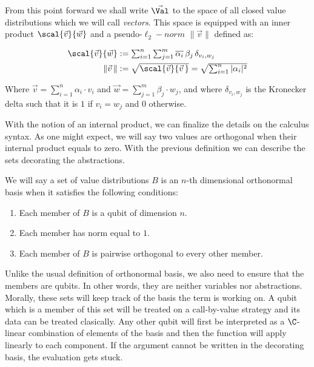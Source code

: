 From this point forward we shall write $\vec{\Val}$ to the space of all closed value distributions which we will call \emph{vectors}. This space is equipped with an inner product $\scal{\vec v}{\vec w}$ and a pseudo-$\ell_2-norm$ $\|\vec v\|$ defined as:

\begin{align*}
  \textstyle\scal{\vec{v}}{\vec{w}}&:=\textstyle\sum_{i=1}^n\sum_{j=1}^m\overline{\alpha_i}\,\beta_j\,\delta_{v_i,w_j}\\
  \textstyle\|\vec{v}\,\|&:=\textstyle\sqrt{\scal{\vec{v}}{\vec{v}\,}}=\textstyle\sqrt{\sum_{i=1}^n|\alpha_i|^2}    
\end{align*}

Where $\vec{v}=\sum_{i=1}^n\alpha_i\cdot v_i$ and $\vec{w}=\sum_{j=1}^m\beta_j\cdot w_j$, and where $\delta_{v_i,w_j}$ is the Kronecker delta such that it is $1$ if $v_i=w_j$ and $0$ otherwise.

With the notion of an internal product, we can finalize the details on the calculus syntax. As one might expect, we will say two values are orthogonal when their internal product equals to zero. With the previous definition we can describe the sets decorating the abstractions.

\begin{definition}\label{def:NthDimensionalBasis}
We will say a set of value distributions $B$ is an $n$-th dimensional orthonormal basis when it satisfies the following conditions:
\begin{enumerate}
  \item Each member of $B$ is a qubit of dimension $n$.
  \item Each member has norm equal to $1$.
  \item Each member of $B$ is pairwise orthogonal to every other member. 
\end{enumerate}
\end{definition}

Unlike the usual definition of orthonormal basis, we also need to ensure that the members are qubits. In other words, they are neither variables nor abstractions. Morally, these sets will keep track of the basis the term is working on. A qubit which is a member of this set will be treated on a call-by-value strategy and its data can be treated clasically. Any other qubit will first be interpreted as a $\C$-linear combination of elements of the basis and then the function will apply linearly to each component. If the argument cannot be written in the decorating basis, the evaluation gets stuck. 

